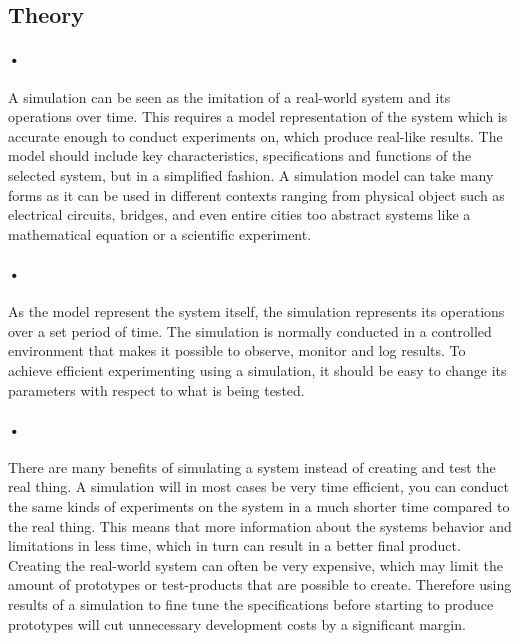 \documentclass[a4paper]{report}
\begin{document}
\subsection{Theory}
{\color{red}
\paragraph{•}
A simulation can be seen as the imitation of a real-world system and its operations over time.
This requires a model representation of the system which is accurate enough to conduct experiments on, which produce real-like results.
The model should include key characteristics, specifications and functions of the selected system, but in a simplified fashion.
A simulation model can take many forms as it can be used in different contexts ranging from physical object such as electrical circuits, bridges, and even entire cities too abstract systems like a mathematical equation or a scientific experiment. %

\paragraph{•}
As the model represent the system itself, the simulation represents its operations over a set period of time.
The simulation is normally conducted in a controlled environment that makes it possible to observe, monitor and log results.
To achieve efficient experimenting using a simulation, it should be easy to change its parameters with respect to what is being tested.

\paragraph{•}
There are many benefits of simulating a system instead of creating and test the real thing.
A simulation will in most cases be very time efficient, you can conduct the same kinds of experiments on the system in a much shorter time compared to the real thing.
This means that more information about the systems behavior and limitations in less time, which in turn can result in a better final product.
Creating the real-world system can often be very expensive, which may limit the amount of prototypes or test-products that are possible to create.
Therefore using results of a simulation to fine tune the specifications before starting to produce prototypes will cut unnecessary development costs by a significant margin.

}
\end{document}
